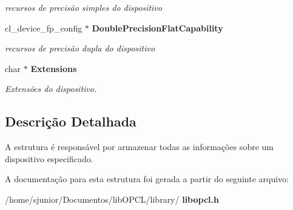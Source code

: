\begin{DoxyCompactItemize}
\begin{DoxyCompactList}\small\item\em recursos de precisão simples do dispositivo \end{DoxyCompactList}\item 
\mbox{\label{structdevices_a9f9941ab957970afe7995713675e0c16}} 
cl\+\_\+device\+\_\+fp\+\_\+config $\ast$ \textbf{ Double\+Precision\+Flat\+Capability}
\begin{DoxyCompactList}\small\item\em recursos de precisão dupla do dispositivo \end{DoxyCompactList}\item 
\mbox{\label{structdevices_a04797e250a09482a400749add9f8862e}} 
char $\ast$ \textbf{ Extensions}
\begin{DoxyCompactList}\small\item\em Extensões do dispositivo. \end{DoxyCompactList}\end{DoxyCompactItemize}


\subsection{Descrição Detalhada}
A estrutura é responsável por armazenar todas as informações sobre um dispositivo especificado. 

A documentação para esta estrutura foi gerada a partir do seguinte arquivo\+:\begin{DoxyCompactItemize}
\item 
/home/sjunior/\+Documentos/lib\+O\+P\+C\+L/library/\textbf{ libopcl.\+h}\end{DoxyCompactItemize}
